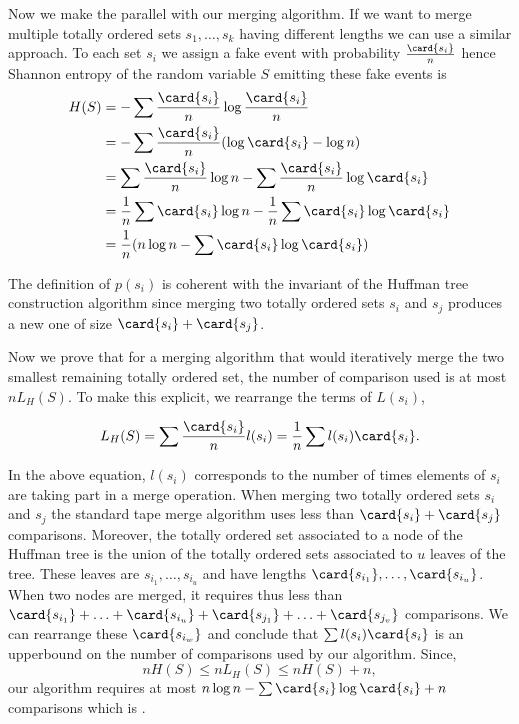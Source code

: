 Now we make the parallel with our merging algorithm. If we want to merge
multiple totally ordered sets \(s_1,\ldots,s_k\) having different lengths we can use a similar
approach. To each set \(s_i\) we assign a fake event with probability
\(\frac{\card{s_i}}{n}\) hence Shannon entropy of the random variable
\(S\) emitting these fake events is
\begin{align}
H(S) &= - \sum \frac{\card{s_i}}{n} \log \frac{\card{s_i}}{n}\\
&= - \sum \frac{\card{s_i}}{n} (\log \card{s_i} - \log n)\\
&= \sum \frac{\card{s_i}}{n} \log n - \sum \frac{\card{s_i}}{n} \log \card{s_i}\\
&= \frac{1}{n} \sum \card{s_i} \log n - \frac{1}{n} \sum \card{s_i} \log \card{s_i}\\
&= \frac{1}{n} (n \log n - \sum \card{s_i} \log \card{s_i})\\
\end{align}

The definition of \(p(s_i)\) is coherent with the invariant of
the Huffman tree construction algorithm since merging two totally ordered sets
\(s_i\) and \(s_j\) produces a new one of size \(\card{s_i} + \card{s_j}\).

Now we prove that for a merging algorithm that would iteratively merge the two
smallest remaining totally ordered set, the number of comparison used is at
most \(n L_H(S)\). To make this explicit, we rearrange the terms of \(L(s_i)\),

\begin{displaymath}
L_H(S) = \sum \frac{\card{s_i}}{n} l(s_i) = \frac{1}{n} \sum l(s_i) \card{s_i}.
\end{displaymath}

In the above equation, \(l(s_i)\) corresponds to the number of times elements
of \(s_i\) are taking part in a merge operation. When merging two totally
ordered sets \(s_i\) and \(s_j\) the standard tape merge algorithm uses less
than \(\card{s_i} + \card{s_j}\) comparisons. Moreover, the totally ordered set
associated to a node of the Huffman tree is the union of the totally ordered
sets associated to \(u\) leaves of the tree. These leaves are
\(s_{i_1},\ldots,s_{i_u}\) and have lengths
\(\card{s_{i_1}},\ldots,\card{s_{i_u}}\). When two nodes are merged, it
requires thus less than
\(\card{s_{i_1}}+\ldots+\card{s_{i_u}}+\card{s_{j_1}}+\ldots+\card{s_{j_v}}\)
comparisons. We can rearrange these \(\card{s_{i_w}}\) and conclude that
\(\sum l(s_i) \card{s_i}\) is an upperbound on the number of comparisons used
by our algorithm. Since,
\begin{displaymath}
n H(S) \le n L_H(S) \le n H(S) + n,
\end{displaymath}
our algorithm requires at most \(n \log n - \sum \card{s_i} \log \card{s_i} +
n\) comparisons which is .

